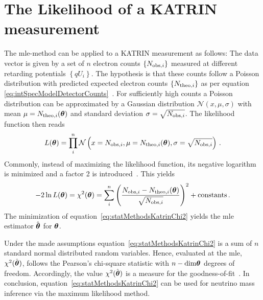 \section{The Likelihood of a KATRIN measurement}
\label{sec:statMethodsKATRINLikelihood}
The \gls{mle}-method can be applied to a KATRIN measurement as follows: The data vector is given by a set of $n$ electron counts $\left\{N_{\mathrm{obs,}i}\right\}$ measured at different retarding potentials $\left\{qU_i\right\}$. The hypothesis is that these counts follow a Poisson distribution with predicted expected electron counts $\left\{N_{\mathrm{theo,}i}\right\}$ as per equation \eqref{eq:intSpecModelDetectorCounts}~\cite{Kleesiek2014}. For sufficiently high counts a Poisson distribution can be approximated by a Gaussian distribution $\mathcal{N}(x,\mu, \sigma)$ with mean $\mu=N_{\mathrm{theo,}i}(\boldsymbol{\mathbf{\theta}})$ and standard deviation $\sigma=\sqrt{N_{\mathrm{obs,}i}}$.  The likelihood function then reads
\begin{equation}
	\label{eq:KATRINlikelihood}
	L(\boldsymbol{\mathbf{\theta}}) = \prod_{i}^{n} \mathcal{N}\left(
		x=N_{\mathrm{obs,}i},
		\mu=N_{\mathrm{theo,}i}(\boldsymbol{\mathbf{\theta}}),
		\sigma=\sqrt{N_{\mathrm{obs,}i}}
	\right)
	\text{\,.}
\end{equation}
Commonly, instead of maximizing the likelihood function, its negative logarithm is minimized and a factor 2 is introduced~\cite{ReviewOfParticlePhysics}. This yields
\begin{equation}
	\label{eq:statMethodsKatrinChi2}
	-2\ln L(\boldsymbol{\mathbf{\theta}}) = \chi^2(\boldsymbol{\mathbf{\theta}}) = \sum_i^n
		\left( 
			\frac{N_{\mathrm{obs,}i}-N_{\mathrm{theo,}i}(\boldsymbol{\mathbf{\theta}})}{\sqrt{N_{\mathrm{obs,}i}}}
		\right)^2
		 + \mathrm{constants}
		\text{\,.}
\end{equation}
The minimization of equation~\eqref{eq:statMethodsKatrinChi2} yields the \gls{mle} estimator $\hat{\boldsymbol{\mathbf{\theta}}}$ for $\boldsymbol{\mathbf{\theta}}$.

Under the made assumptions equation~\eqref{eq:statMethodsKatrinChi2} is a sum of $n$ standard normal distributed random variables. Hence, evaluated at the \gls{mle},  $\chi^2(\hat{\boldsymbol{\mathbf{\theta}}})$, follows the Pearson's chi-square statistic with $n-\mathrm{dim}\boldsymbol{\mathbf{\theta}}$ degrees of freedom. Accordingly, the value $\chi^2(\hat{\boldsymbol{\mathbf{\theta}}})$ is a measure for the goodness-of-fit~\cite{ReviewOfParticlePhysics}. In conclusion, equation~\eqref{eq:statMethodsKatrinChi2} can be used for neutrino mass inference via the maximum likelihood method.

